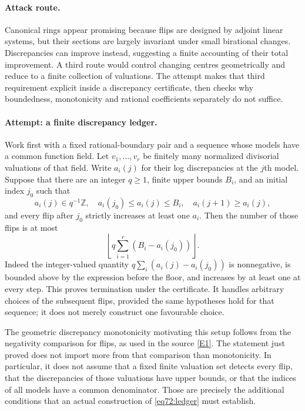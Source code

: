 \documentclass[11pt,a4paper]{article}
\numberwithin{equation}{section}
\newcommand{\Z}{\mathbb{Z}}
\newcommand{\eref}[2]{\hyperlink{extra:#1:#2}{[E#2]}}
\begin{document}
\paragraph{Attack route.}
Canonical rings appear promising because flips are designed by adjoint
linear systems, but their sections are largely invariant under small
birational changes. Discrepancies can improve instead, suggesting a finite
accounting of their total improvement. A third route would control changing
centres geometrically and reduce to a finite collection of valuations.
The attempt makes that third requirement explicit inside a discrepancy
certificate, then checks why boundedness, monotonicity and rational
coefficients separately do not suffice.

\paragraph{Attempt: a finite discrepancy ledger.}
Work first with a fixed rational-boundary pair and a sequence whose models
have a common function field. Let $v_1,\ldots,v_r$ be finitely many
normalized divisorial valuations of that field. Write $a_i(j)$ for their
log discrepancies at the $j$th model. Suppose that there are an integer
$q\geq1$, finite upper bounds $B_i$, and an initial index $j_0$ such that
\begin{equation}\label{eq72:ledger}
 a_i(j)\in q^{-1}\Z,\quad
 a_i(j_0)\leq a_i(j)\leq B_i,\quad
 a_i(j+1)\geq a_i(j),
\end{equation}
and every flip after $j_0$ strictly increases at least one $a_i$.
Then the number of those flips is at most
\begin{equation}\label{eq72:bound}
 \left\lfloor q\sum_{i=1}^r(B_i-a_i(j_0))\right\rfloor.
\end{equation}
Indeed the integer-valued quantity
$q\sum_i(a_i(j)-a_i(j_0))$ is nonnegative, is bounded above by the
expression before the floor, and increases by at least one at every step.
This proves termination under the certificate. It handles arbitrary choices
of the subsequent flips, provided the same hypotheses hold for that
sequence; it does not merely construct one favourable choice.

The geometric discrepancy monotonicity motivating this setup follows from
the negativity comparison for flips, as used in the source
\eref{statement}{1}. The statement just proved does not import more from that
comparison than monotonicity. In particular, it does not assume that a
fixed finite valuation set detects every flip, that the discrepancies of
those valuations have upper bounds, or that the indices of all models
have a common denominator. Those are precisely the additional conditions
that an actual construction of \eqref{eq72:ledger} must establish.
\end{document}
